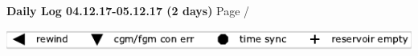 \noindent \large{\textbf{Daily Log 04.12.17-05.12.17 (2 days)}} \hfill \small{Page \thepage/\pageref{LastPage}}

\vspace{0.5em}
\centerline{\includegraphics{legendSymbols.pdf}}
\vspace{0.1em}